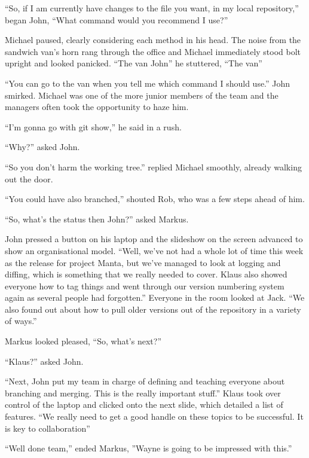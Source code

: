 \begin{trenches}
``So, if I am currently have changes to the file you want, in my local repository,'' began John, ``What command would you recommend I use?''

Michael paused, clearly considering each method in his head.  The noise from the sandwich van's horn rang through the office and Michael immediately stood bolt upright and looked panicked.  ``The van John'' he stuttered, ``The van''

``You can go to the van when you tell me which command I should use.''  John smirked.  Michael was one of the more junior members of the team and the managers often took the opportunity to haze him.

``I'm gonna go with git show,'' he said in a rush.

``Why?'' asked John.

``So you don't harm the working tree.'' replied Michael smoothly, already walking out the door.

``You could have also branched,'' shouted Rob, who was a few steps ahead of him.

\thoughtbreak

``So, what's the status then John?'' asked Markus.

John pressed a button on his laptop and the slideshow on the screen advanced to show an organisational model.  ``Well, we've not had a whole lot of time this week as the release for project Manta, but we've managed to look at logging and diffing, which is something that we really needed to cover.  Klaus also showed everyone how to tag things and went through our version numbering system again as several people had forgotten.''  Everyone in the room looked at Jack.  ``We also found out about how to pull older versions out of the repository in a variety of ways.''

Markus looked pleased, ``So, what's next?''

``Klaus?'' asked John.

``Next, John put my team in charge of defining and teaching everyone about branching and merging.  This is the really important stuff.''  Klaus took over control of the laptop and clicked onto the next slide, which detailed a list of features.  ``We really need to get a good handle on these topics to be successful.  It is key to collaboration''

``Well done team,'' ended Markus, ''Wayne is going to be impressed with this.''

\end{trenches}


